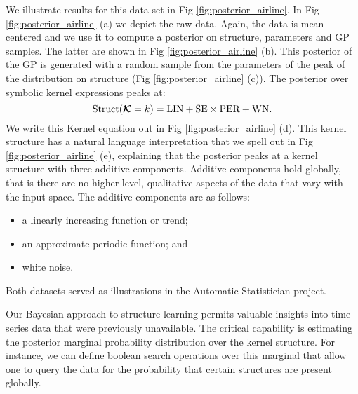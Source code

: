 We illustrate results for this data set in Fig \ref{fig:posterior_airline}. In Fig \ref{fig:posterior_airline} (a) we depict the raw data. 
Again, the data is mean centered and we use it to 
compute a posterior on structure, parameters and \ac{GP}
samples.
The latter are shown in  Fig \ref{fig:posterior_airline} (b).
This posterior of the \ac{GP} is generated with a random sample from the parameters
of the peak of the distribution on structure (Fig \ref{fig:posterior_airline} (c)).
The posterior over symbolic kernel expressions peaks at:
\begin{equation}
\text{Struct}(\bm{\mathcal{K}} = k )=\text{LIN} +  \text{SE} \times \text{PER}+ \text{WN}.
\end{equation}
We write this Kernel equation out in Fig \ref{fig:posterior_airline} (d).
This kernel structure has a natural language interpretation that we spell out in
Fig \ref{fig:posterior_airline} (e), explaining that 
the posterior peaks at a kernel structure with three additive components.
Additive components hold globally, that is there are no higher level, qualitative aspects
of the data that vary with the input space.
The additive components are as follows: 
\begin{itemize}
\item a linearly increasing function or trend;
\item an approximate periodic function; and
\item  white noise.
\end{itemize}
Both datasets served as illustrations in the Automatic Statistician project.



Our Bayesian approach to structure learning permits valuable insights
into time series data that were previously unavailable.
The critical capability is estimating the posterior marginal
probability distribution over the kernel structure.
For instance, we can define boolean search operations over this marginal
that allow one to query the data
for the probability that certain structures are present globally.

